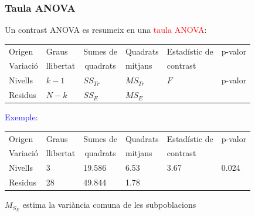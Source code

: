 \documentclass[12pt,t]{beamer}
\newcommand{\red}[1]{\textcolor{red}{#1}}
\newcommand{\blue}[1]{\textcolor{blue}{#1}}
\theoremstyle{plain}
\theoremstyle{definition}
\begin{document}
\begin{frame}
\frametitle{Taula ANOVA}

Un contrast ANOVA es resumeix en una \red{taula ANOVA}:
{\footnotesize \begin{center}
\hspace*{-3ex}
\begin{tabular}{ll@{}@{}l@{}@{}l@{}l@{}l}
\hline
Origen&Graus&\hspace*{0.6ex} Sumes de&\hspace*{1ex} Quadrats&\hspace*{1ex} Estadístic de&\hspace*{1ex} p-valor\\
Variació&llibertat&\multicolumn{1}{c}{quadrats}&\hspace*{1ex} mitjans&\hspace*{1ex} contrast\\\hline
Nivells \vphantom{$\displaystyle \int$} &$k-1$&\hspace*{1ex} $SS_{Tr}$&\hspace*{1ex} $MS_{Tr}$&\hspace*{2ex}$F$&\hspace*{1ex} p-valor \\[1ex]
Residus&$N-k$&\hspace*{1 ex} $SS_E$&\hspace*{1ex} $MS_E$&\\\hline
\end{tabular}
\end{center}}
\pause\medskip

\blue{Exemple}:
{\footnotesize \begin{center}
\begin{tabular}{ll@{}@{}l@{}@{}l@{}l@{}l}
\hline
Origen&Graus&\hspace*{0.6ex} Sumes de&\hspace*{1ex} Quadrats&\hspace*{1ex} Estadístic de & \hspace*{1ex} p-valor\\
Variació&llibertat&\multicolumn{1}{c}{quadrats}&\hspace*{1ex} mitjans&\hspace*{1ex} contrast\\\hline
Nivells \vphantom{$\displaystyle \int$} &3&\hspace*{1ex} 19.586 &\hspace*{1ex} 6.53 &\hspace*{2ex} 3.67 & \hspace*{1ex} 0.024 \\[1ex]
Residus&28&\hspace*{1 ex} 49.844&\hspace*{1ex} 1.78 &\\\hline
\end{tabular}
\end{center}}\medskip

$M_{S_E}$ estima la variància comuna de les subpoblacions
\end{frame}
\end{document}
